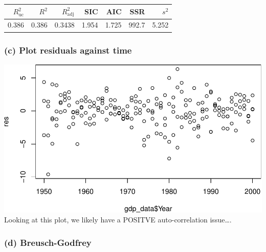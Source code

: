 \documentclass[11pt,]{article}
\newenvironment{Shaded}{\begin{snugshade}}{\end{snugshade}}
\newcommand{\KeywordTok}[1]{\textcolor[rgb]{0.13,0.29,0.53}{\textbf{#1}}}
\newcommand{\DecValTok}[1]{\textcolor[rgb]{0.00,0.00,0.81}{#1}}
\newcommand{\StringTok}[1]{\textcolor[rgb]{0.31,0.60,0.02}{#1}}
\newcommand{\OperatorTok}[1]{\textcolor[rgb]{0.81,0.36,0.00}{\textbf{#1}}}
\newcommand{\NormalTok}[1]{#1}
\begin{document}
\begin{Shaded}
\end{Shaded}

\begin{longtable}[]{@{}rrrrrrr@{}}
\toprule
\(R^2_\text{uc}\) & \(R^2\) & \(R^2_\text{adj}\) & SIC & AIC & SSR &
\(s^2\)\tabularnewline
\midrule
\endhead
0.386 & 0.386 & 0.3438 & 1.954 & 1.725 & 992.7 & 5.252\tabularnewline
\bottomrule
\end{longtable}

\subsubsection{(c) Plot residuals against
time}\label{c-plot-residuals-against-time}

\begin{Shaded}
\end{Shaded}

\includegraphics{ps4_code_files/figure-latex/plot_resid-1.pdf} Looking
at this plot, we likely have a POSITVE auto-correlation issue\ldots{}.

\subsubsection{(d) Breusch-Godfrey}\label{d-breusch-godfrey}
\end{document}
